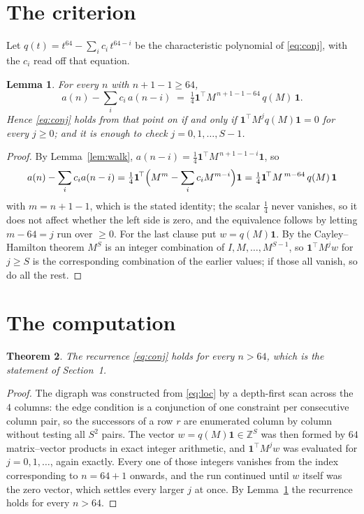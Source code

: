 \documentclass[11pt,a4paper]{article}
\theoremstyle{plain}
\newtheorem{theorem}{Theorem}
\newtheorem{lemma}[theorem]{Lemma}
\theoremstyle{definition}
\begin{document}
\section{The criterion}

Let $q(t)=t^{64}-\sum_i c_i\,t^{64-i}$ be the characteristic polynomial of
\eqref{eq:conj}, with the $c_i$ read off that equation.

\begin{lemma}\label{lem:crit}
For every $n$ with $n+1-1\ge64$,
\[
a(n)-\sum_i c_i\,a(n-i)\;=\;\tfrac1{4}\mathbf{1}^{\!\top}M^{\,n+1-1-64}\,q(M)\,\mathbf{1} .
\]
Hence \eqref{eq:conj} holds from that point on if and only if
$\mathbf{1}^{\!\top}M^{j}q(M)\mathbf{1}=0$ for every $j\ge0$; and it is enough to check
$j=0,1,\dots,S-1$.
\end{lemma}

\begin{proof}
By Lemma~\ref{lem:walk}, $a(n-i)=\tfrac1{4}\mathbf{1}^{\!\top}M^{\,n+1-1-i}\mathbf{1}$, so
\[
a(n)-\sum_i c_i a(n-i)
=\tfrac1{4}\mathbf{1}^{\!\top}\Bigl(M^{m}-\sum_i c_i M^{m-i}\Bigr)\mathbf{1}
=\tfrac1{4}\mathbf{1}^{\!\top}M^{\,m-64}\,q(M)\,\mathbf{1}
\]
with $m=n+1-1$, which is the stated identity; the scalar $\tfrac1{4}$ never vanishes, so it does not affect whether the left side is zero, and the equivalence follows by letting
$m-64=j$ run over $\ge0$. For the last clause put $w=q(M)\mathbf{1}$. By the
Cayley--Hamilton theorem $M^{S}$ is an integer combination of $I,M,\dots,M^{S-1}$, so
$\mathbf{1}^{\!\top}M^{j}w$ for $j\ge S$ is the corresponding combination of the earlier
values; if those all vanish, so do all the rest.
\end{proof}

\section{The computation}

\begin{theorem}
The recurrence \eqref{eq:conj} holds for every $n>64$, which is the statement of
Section~1.
\end{theorem}

\begin{proof}
The digraph was constructed from \eqref{eq:loc} by a depth-first scan across the $4$
columns: the edge condition is a conjunction of one constraint per consecutive column
pair, so the successors of a row $r$ are enumerated column by column without testing all
$S^2$ pairs. The vector $w=q(M)\mathbf{1}\in\mathbb{Z}^{S}$ was then formed by $64$
matrix--vector products in exact integer arithmetic, and $\mathbf{1}^{\!\top}M^{j}w$ was
evaluated for $j=0,1,\dots$, again exactly. Every one of those integers vanishes from the
index corresponding to $n=64+1$ onwards, and the run continued until $w$ itself was the
zero vector, which settles every larger $j$ at once. By Lemma~\ref{lem:crit} the recurrence
holds for every $n>64$.
\end{proof}
\end{document}
